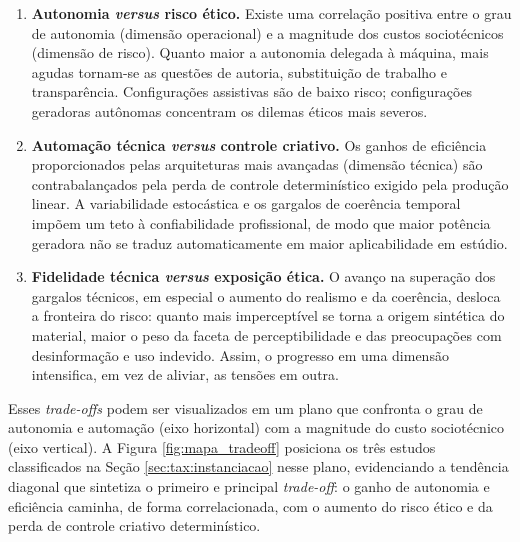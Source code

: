 \begin{enumerate}
    \item \textbf{Autonomia \textit{versus} risco ético.} Existe uma correlação positiva entre o grau de autonomia (dimensão operacional) e a magnitude dos custos sociotécnicos (dimensão de risco). Quanto maior a autonomia delegada à máquina, mais agudas tornam-se as questões de autoria, substituição de trabalho e transparência. Configurações assistivas são de baixo risco; configurações geradoras autônomas concentram os dilemas éticos mais severos.
    \item \textbf{Automação técnica \textit{versus} controle criativo.} Os ganhos de eficiência proporcionados pelas arquiteturas mais avançadas (dimensão técnica) são contrabalançados pela perda de controle determinístico exigido pela produção linear. A variabilidade estocástica e os gargalos de coerência temporal impõem um teto à confiabilidade profissional, de modo que maior potência geradora não se traduz automaticamente em maior aplicabilidade em estúdio.
    \item \textbf{Fidelidade técnica \textit{versus} exposição ética.} O avanço na superação dos gargalos técnicos, em especial o aumento do realismo e da coerência, desloca a fronteira do risco: quanto mais imperceptível se torna a origem sintética do material, maior o peso da faceta de perceptibilidade e das preocupações com desinformação e uso indevido. Assim, o progresso em uma dimensão intensifica, em vez de aliviar, as tensões em outra.
\end{enumerate}

Esses \textit{trade-offs} podem ser visualizados em um plano que confronta o grau de autonomia e automação (eixo horizontal) com a magnitude do custo sociotécnico (eixo vertical). A Figura \ref{fig:mapa_tradeoff} posiciona os três estudos classificados na Seção \ref{sec:tax:instanciacao} nesse plano, evidenciando a tendência diagonal que sintetiza o primeiro e principal \textit{trade-off}: o ganho de autonomia e eficiência caminha, de forma correlacionada, com o aumento do risco ético e da perda de controle criativo determinístico.

